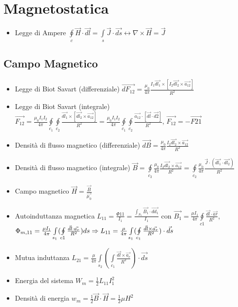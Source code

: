 \documentclass{article}
\begin{document}
\section{Magnetostatica}
\begin{itemize}
	\item Legge di Ampere \( \oint\limits_{c} \vec{H} \cdot \vec{dl} = \int\limits_{s} \vec{J} \cdot \vec{ds} \leftrightarrow \nabla \times \vec{H} = \vec{J} \)
\end{itemize}

\subsection{Campo Magnetico}
\begin{itemize}
	\item Legge di Biot Savart (differenziale) \( \vec{dF_{12}} = \frac{\mu_0}{4 \pi} \frac{I_1 \vec{dl_1} \times [I_2 \vec{dl_2} \times \vec{a_{12}}] }{R^2} \)
	\item Legge di Biot Savart (integrale) \( \vec{F_{12}} = \frac{\mu_0 I_1 I_2}{4 \pi} \oint\limits_{c_1} \oint\limits_{c_2} \frac{\vec{dl_1} \times [\vec{dl_2} \times \vec{a_{12}}]} {R^2} = \frac{\mu_0 I_1 I_2}{4 \pi} \oint\limits_{c_1} \oint\limits_{c_2} \frac{\vec{a_{12}} \cdot [\vec{dl} \cdot \vec{d2}]} {R^2} \), \(\vec{F_{12}} = - \vec{F{21}} \)
	\item Densità di flusso magnetico (differenziale) \( \vec{dB} = \frac{\mu_0}{4 \pi} \frac{I_2 \vec{dl_2} \times \vec{a_{12}}}{R^2} \)
	\item Densità di flusso magnetico (integrale) \( \vec{B} = \oint\limits_{c_2} \frac{\mu_0}{4 \pi} \frac{I_2 \vec{dl_2} \times \vec{a_{12}}}{R^2} = \oint\limits_{c_2} \frac{\mu_0}{4 \pi} \frac{\vec{J} \cdot ( \vec{dl_{1}} \cdot \vec{dl_2} )}{R^2}\)
	\item Campo magnetico \( \vec{H} = \frac{\vec{B}}{\vec{\mu_0}} \)
	\item Autoinduttanza magnetica \(L_{11} = \frac{\Phi{11}}{I_1} = \frac{\int_{S_1} \vec{B_1} \cdot \vec{dd_1}}{I_1} \) con \( \vec{B_1} = \frac{\mu I_1}{4 \pi} \oint\limits_{c1} \frac{\vec{dl} \cdot \vec{ar}}{R^2} \), \(\Phi_{m, 11} = \frac{\mu I_1}{4 \pi} \int\limits_{s_1} ( \oint\limits_{c1} \frac{\vec{dl} \cdot \vec{a_r}}{R^2}) ds \linebreak \Rightarrow L_{11} = \frac{\mu}{4 \pi} \int\limits_{s_1} ( \oint\limits_{c_1} \frac{\vec{dl} \times \vec{a_r}}{R^2}) \cdot \vec{ds}\)
	\item Mutua induttanza \( L_{21} = \frac{\mu}{4 \pi} \int\limits_{s_2} ( \int\limits_{c_1} \frac{\vec{dl} \times \vec{a_r}}{R^2} ) \cdot \vec{ds} \)
	\item Energia del sistema \( W_m = \frac{1}{2} L_{11} I_1^2 \)
	\item Densità di energia  \( w_m = \frac{1}{2} \vec{B} \cdot \vec{H} = \frac{1}{2} \mu H^2 \)
\end{itemize}
\end{document}
